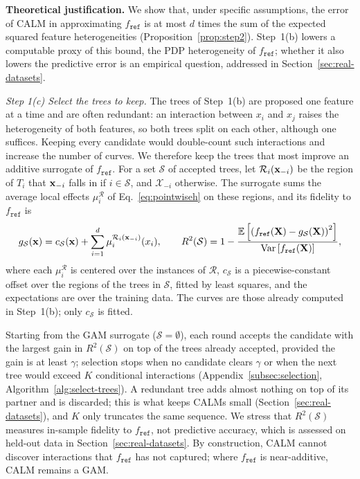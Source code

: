 \textbf{Theoretical justification.}
We show that, under specific assumptions, the error of CALM in approximating $f_{\texttt{ref}}$ is at most $d$ times the sum of the expected squared feature heterogeneities (Proposition~\ref{prop:step2}).
Step~1(b) lowers a computable proxy of this bound, the PDP heterogeneity of $f_{\texttt{ref}}$; whether it also lowers the predictive error is an empirical question, addressed in Section~\ref{sec:real-datasets}.

\textit{Step 1(c) Select the trees to keep.}
The trees of Step~1(b) are proposed one feature at a time and are often redundant: an interaction between $x_i$ and $x_j$ raises the heterogeneity of both features, so both trees split on each other, although one suffices.
Keeping every candidate would double-count such interactions and increase the number of curves.
We therefore keep the trees that most improve an additive surrogate of $f_{\texttt{ref}}$.
For a set $\mathcal{S}$ of accepted trees, let $\mathcal{R}_i(\mathbf{x}_{-i})$ be the region of $T_i$ that $\mathbf{x}_{-i}$ falls in if $i \in \mathcal{S}$, and $\mathcal{X}_{-i}$ otherwise.
The surrogate sums the average local effects $\mu_i^{\mathcal{R}}$ of Eq.~\eqref{eq:pointwiseh} on these regions, and its fidelity to $f_{\texttt{ref}}$ is
\begin{equation}
\label{eq:surrogate-r2}
g_{\mathcal{S}}(\mathbf{x}) = c_{\mathcal{S}}(\mathbf{x}) + \sum_{i=1}^d \mu_i^{\mathcal{R}_i(\mathbf{x}_{-i})}(x_i),
\qquad
R^2(\mathcal{S}) = 1 - \frac{\mathbb{E}\left[\left(f_{\texttt{ref}}(\mathbf{X}) - g_{\mathcal{S}}(\mathbf{X})\right)^2\right]}{\mathrm{Var}\left[f_{\texttt{ref}}(\mathbf{X})\right]},
\end{equation}
where each $\mu_i^{\mathcal{R}}$ is centered over the instances of $\mathcal{R}$, $c_{\mathcal{S}}$ is a piecewise-constant offset over the regions of the trees in $\mathcal{S}$, fitted by least squares, and the expectations are over the training data.
The curves are those already computed in Step~1(b); only $c_{\mathcal{S}}$ is fitted.

Starting from the GAM surrogate ($\mathcal{S} = \emptyset$), each round accepts the candidate with the largest gain in $R^2(\mathcal{S})$ on top of the trees already accepted, provided the gain is at least $\gamma$; selection stops when no candidate clears $\gamma$ or when the next tree would exceed $K$ conditional interactions (Appendix~\ref{subsec:selection}, Algorithm~\ref{alg:select-trees}).
A redundant tree adds almost nothing on top of its partner and is discarded; this is what keeps CALMs small (Section~\ref{sec:real-datasets}), and $K$ only truncates the same sequence.
We stress that $R^2(\mathcal{S})$ measures in-sample fidelity to $f_{\texttt{ref}}$, not predictive accuracy, which is assessed on held-out data in Section~\ref{sec:real-datasets}.
By construction, CALM cannot discover interactions that $f_{\texttt{ref}}$ has not captured; where $f_{\texttt{ref}}$ is near-additive, CALM remains a GAM.

